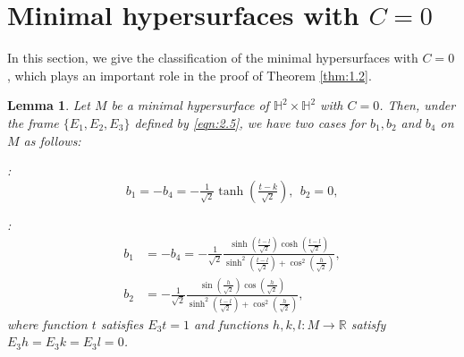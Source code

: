 \documentclass[reqno]{amsart}%
\newtheorem{lemma}[theorem]{Lemma}
\theoremstyle{definition}
\newtheorem{remark}{Remark}[section]
\numberwithin{equation}{section}
\begin{document}


\section{Minimal hypersurfaces with $C=0$}\label{sect:4}
%
In this section, we give the classification of the minimal hypersurfaces with $C=0$, which
plays an important role in the proof of Theorem \ref{thm:1.2}. 

\begin{lemma}\label{lemma:2.1aaa1}
Let $M$ be a minimal hypersurface of $\mathbb{H}^2\times \mathbb{H}^2$ with $C=0$.
Then, under the frame $\{E_1,E_2,E_3\}$ defined by \eqref{eqn:2.5}, we have two cases
for $b_1,b_2$ and $b_4$ on $M$ as follows:

:
$$
b_1=-b_4=-\tfrac{1}{\sqrt{2}}\tanh(\tfrac{t-k}{\sqrt{2}}),\ \ b_2=0,
$$

:
\begin{equation}\label{eq:j}
\begin{aligned}
b_1&=-b_4=-\tfrac{1}{\sqrt{2}}\frac{\sinh(\frac{t-l}{\sqrt{2}})\cosh(\frac{t-l}{\sqrt{2}})}
{\sinh^2(\frac{t-l}{\sqrt{2}})+\cos^2(\frac{h}{\sqrt{2}})},\\
b_2&=-\tfrac{1}{\sqrt{2}}\frac{\sin(\frac{h}{\sqrt{2}})\cos(\frac{h}{\sqrt{2}})}
{\sinh^2(\frac{t-l}{\sqrt{2}})+\cos^2(\frac{h}{\sqrt{2}})},
\end{aligned}	
\end{equation}
where function $t$ satisfies $E_3t=1$ and functions $h, k, l:M\rightarrow \mathbb{R}$
satisfy $E_3h=E_3k=E_3l=0$.

\end{lemma}
%
\end{document}
